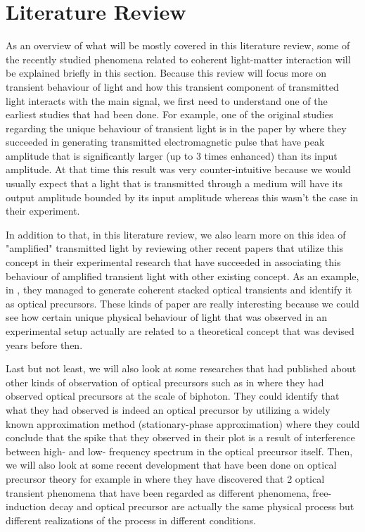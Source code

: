 \chapter{Literature Review}
As an overview of what will be mostly covered in this literature review, some of the recently studied phenomena related to coherent light-matter interaction will be explained briefly in this section. Because this review will focus more on transient behaviour of light and how this transient component of transmitted light interacts with the main signal, we first need to understand one of the earliest studies that had been done. For example, one of the original studies regarding the unique behaviour of transient light is in the paper by  where they succeeded in generating transmitted electromagnetic pulse that have peak amplitude that is significantly larger (up to 3 times enhanced) than its input amplitude. At that time this result was very counter-intuitive because we would usually expect that a light that is transmitted through a medium will have its output amplitude bounded by its input amplitude whereas this wasn't the case in their experiment.

In addition to that, in this literature review, we also learn more on this idea of "amplified" transmitted light by reviewing other recent papers that utilize this concept in their experimental research that have succeeded in associating this behaviour of amplified transient light with other existing concept. As an example, in , they managed to generate coherent stacked optical transients and identify it as optical precursors. These kinds of paper are really interesting because we could see how certain unique physical behaviour of light that was observed in an experimental setup actually are related to a theoretical concept that was devised years before then.

Last but not least, we will also look at some researches that had published about other kinds of observation of optical precursors such as in  where they had observed optical precursors at the scale of biphoton. They could identify that what they had observed is indeed an optical precursor by utilizing a widely known approximation method (stationary-phase approximation) where they could conclude that the spike that they observed in their plot is a result of interference between high- and low- frequency spectrum in the optical precursor itself. Then, we will also look at some recent development that have been done on optical precursor theory for example in  where they have discovered that 2 optical transient phenomena that have been regarded as different phenomena, free-induction decay and optical precursor are actually the same physical process  but different realizations of the process in different conditions.

